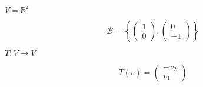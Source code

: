 \documentclass{article}
\begin{document}
$ V= \mathbb{R}^2 $
\pagebreak

\[ \mathcal{B} = \left\{ \begin{pmatrix} 1 \\ 0 \end{pmatrix}, \begin{pmatrix} 0 \\ -1 \end{pmatrix} \right\} \]
\pagebreak

$ T: V \rightarrow V $
\pagebreak

\[ T(v)= \begin{pmatrix} -v_2 \\ v_1 \end{pmatrix} \]
\pagebreak
\end{document}
